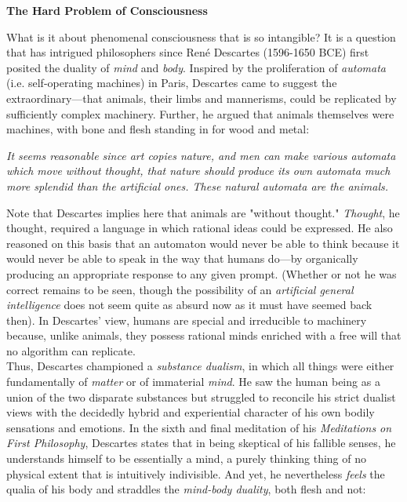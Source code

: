 \begin{tcolorbox}[breakable, enhanced, colback=textbook-blue, sharp corners]
	\vspace{3mm}
	\begin{center}
		\textbf{The Hard Problem of Consciousness}
	\end{center}
	What is it about phenomenal consciousness that is so intangible? It is a question that has intrigued philosophers since Ren\'e Descartes (1596-1650 BCE) first posited the duality of \textit{mind} and \textit{body}. Inspired by the proliferation of \textit{automata} (i.e. self-operating machines) in Paris, Descartes came to suggest the extraordinary---that animals, their limbs and mannerisms, could be replicated by sufficiently complex machinery. Further, he argued that animals themselves were machines, with bone and flesh standing in for wood and metal: \\
	
	\begin{displayquote}
		\textit{It seems reasonable since art copies nature, and men can make various automata which move without thought, that nature should produce its own automata much more splendid than the artificial ones. These natural automata are the animals. \\}
	\end{displayquote}
	
	Note that Descartes implies here that animals are "without thought." \textit{Thought}, he thought, required a language in which rational ideas could be expressed. He also reasoned on this basis that an automaton would never be able to think because it would never be able to speak in the way that humans do---by organically producing an appropriate response to any given prompt. (Whether or not he was correct remains to be seen, though the possibility of an \textit{artificial general intelligence} does not seem quite as absurd now as it must have seemed back then). In Descartes' view, humans are special and irreducible to machinery because, unlike animals, they possess rational minds enriched with a free will that no algorithm can replicate. \\
	
	Thus, Descartes championed a \textit{substance dualism}, in which all things were either fundamentally of \textit{matter} or of immaterial \textit{mind}. He saw the human being as a union of the two disparate substances but struggled to reconcile his strict dualist views with the decidedly hybrid and experiential character of his own bodily sensations and emotions. In the sixth and final meditation of his \textit{Meditations on First Philosophy}, Descartes states that in being skeptical of his fallible senses, he understands himself to be essentially a mind, a purely thinking thing of no physical extent that is intuitively indivisible. And yet, he nevertheless \textit{feels} the qualia of his body and straddles the \textit{mind-body duality}, both flesh and not: \\
	

\end{tcolorbox}
